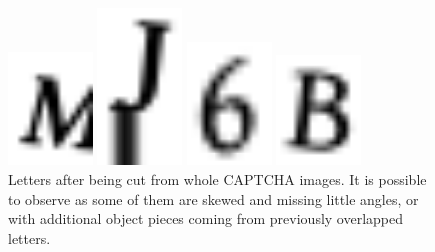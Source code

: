 \begin{figure}
	\centering
	\begin{minipage}{0.20\textwidth}
		\centering
		\includegraphics[width=0.2\textwidth]{letter-1.png}
	\end{minipage}
	\begin{minipage}{0.20\textwidth}
		\centering
		\includegraphics[width=0.2\textwidth]{letter-2.png} 

	\end{minipage}
	\begin{minipage}{0.20\textwidth}
		\centering
		\includegraphics[width=0.2\textwidth]{letter-3.png} 
	
	\end{minipage}
	\begin{minipage}{0.20\textwidth}
		\centering
		\includegraphics[width=0.2\textwidth]{letter-4.png} 
	\end{minipage}
	\caption{Letters after being cut from whole CAPTCHA images. It is possible to observe as some of them are skewed and missing little angles, or with additional object pieces coming from previously overlapped letters.}
	\label{fig2-separatedCAPTCHA}
\end{figure}

